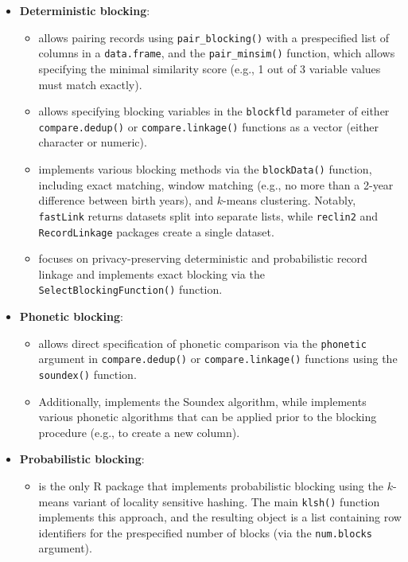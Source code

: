 \begin{itemize}
\tightlist
\item
  \textbf{Deterministic blocking}:

  \begin{itemize}
  \tightlist
  \item
     \citep{reclin2, reclin2-rjournal} allows pairing
    records using \texttt{pair\_blocking()} with a prespecified list of
    columns in a \texttt{data.frame}, and the \texttt{pair\_minsim()} function,
    which allows specifying the minimal similarity score (e.g., 1 out of 3
    variable values must match exactly).
  \item
     \citep{RecordLinkage, RecordLinkage-rjournal} allows specifying blocking variables in
    the \texttt{blockfld} parameter of either \texttt{compare.dedup()} or
    \texttt{compare.linkage()} functions as a vector (either character or
    numeric).
  \item
     \citep{fastLink, enamorado2019using} implements
    various blocking methods via the \texttt{blockData()} function,
    including exact matching, window matching (e.g., no more than a
    2-year difference between birth years), and \(k\)-means
    clustering. Notably, \texttt{fastLink} returns datasets split into
    separate lists, while \texttt{reclin2} and \texttt{RecordLinkage} packages
    create a single dataset.
  \item
     \citep{PPRL} focuses on privacy-preserving
    deterministic and probabilistic record linkage and implements
    exact blocking via the \texttt{SelectBlockingFunction()} function.
  \end{itemize}
\item
  \textbf{Phonetic blocking}:

  \begin{itemize}
  \tightlist
  \item
     allows direct specification of phonetic
    comparison via the \texttt{phonetic} argument in \texttt{compare.dedup()} or
    \texttt{compare.linkage()} functions using the \texttt{soundex()} function.
  \item
    Additionally,  \citep{stringdist} implements the
    Soundex algorithm, while  \citep{phonics}
    implements various phonetic algorithms that can be applied prior
    to the blocking procedure (e.g., to create a new column).
  \end{itemize}
\item
  \textbf{Probabilistic blocking}:

  \begin{itemize}
  \tightlist
  \item
     \citep{klsh} is the only R package that implements
    probabilistic blocking using the \(k\)-means variant of locality
    sensitive hashing. The main \texttt{klsh()} function implements this
    approach, and the resulting object is a list containing row
    identifiers for the prespecified number of blocks (via the
    \texttt{num.blocks} argument).
  \end{itemize}
\end{itemize}

